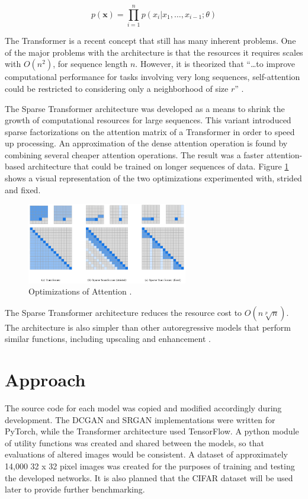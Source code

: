 \documentclass[letterpaper]{article} %
\begin{document}
\begin{equation}
\label{eq:attention_prob}
p(\mathbf{x}) = \prod_{i=1}^{n}p(x_i|x_1,\dots,x_{i-1};\theta)
\end{equation}


The Transformer is a recent concept that still has many inherent problems.
One of the major problems with the architecture
is that the resources it requires scales with $O(n^2)$,
for sequence length $n$. However, it is theorized that
``\dots to improve computational performance for tasks involving very long sequences,
self-attention could be restricted to considering only a neighborhood of size $r$''
\cite{attention_need}.

The Sparse Transformer architecture was developed as a means to shrink the
growth of computational resources for large sequences.
This variant introduced sparse factorizations on the attention matrix
of a Transformer in order to speed up processing.
An approximation of the dense attention
operation is found by combining several cheaper attention operations.
The result was a faster attention-based architecture
that could be trained on longer sequences of data.
Figure \ref{fig:attention_optimization} shows a visual representation of
the two optimizations experimented with, strided and fixed.

\begin{figure}[htbp]
\centerline{\includegraphics[width=7cm]{attention_comparison.png}}
\caption{Optimizations of Attention
\cite{generative_transformers}.}
\label{fig:attention_optimization}
\end{figure}

The Sparse Transformer architecture reduces the resource cost to
$O(n\sqrt[p]{n})$.
The architecture is also simpler than other autoregressive models that perform
similar functions, including upscaling and enhancement \cite{pixel_subscale}.

\section{Approach}
The source code for each model was copied and modified accordingly
during development.
The DCGAN and SRGAN implementations were written for PyTorch,
while the Transformer architecture used TensorFlow.
A python module of utility functions was created and shared between the models,
so that evaluations of altered images would be consistent.
A dataset of approximately 14,000 32 x 32 pixel images was created
for the purposes of training and testing the developed networks.
It is also planned that the CIFAR dataset will be used later to provide
further benchmarking.
\end{document}
